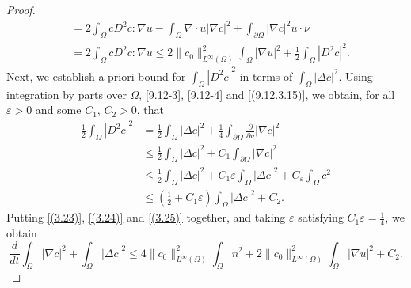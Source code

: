 \documentclass[reqno]{amsart}
\begin{document}
\begin{proof}
\begin{equation}
\begin{aligned}
&= 2 \int_\Omega c D^2 c : \nabla u -\int_\Omega \nabla\cdot u |\nabla c|^2 
 +\int_{\partial\Omega} |\nabla c|^2 u\cdot \nu \\
&= 2 \int_\Omega c D^2 c : \nabla u \leq 2\|c_0\|_{L^\infty(\Omega)}^2 
 \int_\Omega |\nabla u|^2 + \frac{1}{2} \int_\Omega |D^2 c|^2.
\end{aligned}
\end{equation}
Next, we establish a priori bound for $\int_\Omega |D^2 c|^2$ in terms of 
$\int_\Omega |\Delta c|^2$. Using integration by parts over
$\Omega$, \eqref{9.12-3}, \eqref{9.12-4} and \eqref{(9.12.3.15)}, we obtain, 
for all $\varepsilon>0$ and some $C_1$, $C_2>0$, that
\begin{equation}\label{(3.25)}
\begin{aligned}
\frac{1}{2} \int_\Omega |D^2 c|^2
&= \frac{1}{2} \int_\Omega |\Delta c|^2 
 + \frac{1}{4} \int_{\partial\Omega} \frac{\partial}{\partial \nu} |\nabla c|^2 \\
&\leq \frac{1}{2} \int_\Omega |\Delta c|^2 + C_1 \int_{\partial\Omega} |\nabla c|^2 \\
&\leq \frac{1}{2} \int_\Omega |\Delta c|^2 + C_1 \varepsilon \int_\Omega |\Delta c|^2 + C_\varepsilon \int_\Omega c^2\\
&\leq ( \frac{1}{2}+ C_1 \varepsilon ) \int_\Omega |\Delta c|^2 + C_2.
\end{aligned}
\end{equation}
Putting \eqref{(3.23)}, \eqref{(3.24)} and \eqref{(3.25)} together, and taking 
$\varepsilon$ satisfying $ C_1 \varepsilon = \frac{1}{4}$, we obtain
\begin{equation}\label{(3.26)}
\frac{d}{dt} \int_\Omega |\nabla c|^2 + \int_\Omega |\Delta c|^2
\leq 4\|c_0\|_{L^\infty(\Omega)}^2  \int_\Omega n^2 + 2 \|c_0\|_{L^\infty(\Omega)}^2  \int_\Omega |\nabla u|^2 + C_2.
\end{equation}


\end{proof}
\end{document}
